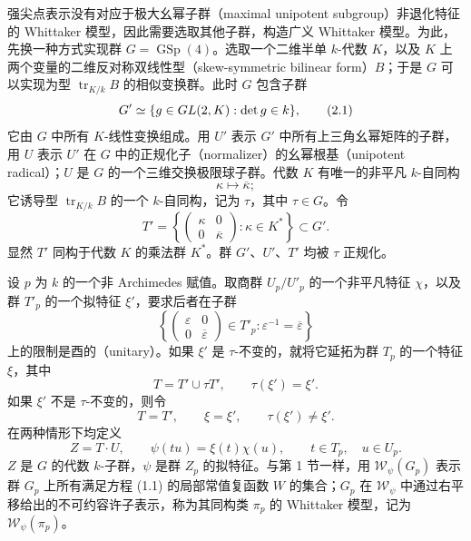 强尖点表示没有对应于极大幺幂子群（maximal unipotent subgroup）非退化特征的 Whittaker 模型，因此需要选取其他子群，构造广义 Whittaker 模型。为此，先换一种方式实现群 $G=\operatorname{GSp}(4)$。选取一个二维半单 $k$-代数 $K$，以及 $K$ 上两个变量的二维反对称双线性型（skew-symmetric bilinear form）$B$；于是 $G$ 可以实现为型 $\operatorname{tr}_{K/k}B$ 的相似变换群。此时 $G$ 包含子群
\begin{equation}
 G'\simeq\{g\in GL(2,K):\det g\in k\},
 \tag{2.1}
\end{equation}
它由 $G$ 中所有 $K$-线性变换组成。用 $U'$ 表示 $G'$ 中所有上三角幺幂矩阵的子群，用 $U$ 表示 $U'$ 在 $G$ 中的正规化子（normalizer）的幺幂根基（unipotent radical）；$U$ 是 $G$ 的一个三维交换极限球子群。代数 $K$ 有唯一的非平凡 $k$-自同构
\begin{equation}
 \kappa\longmapsto\overline\kappa;
 \tag{2.2}
\end{equation}
它诱导型 $\operatorname{tr}_{K/k}B$ 的一个 $k$-自同构，记为 $\tau$，其中 $\tau\in G$。令
\[
 T'=\left\{\begin{pmatrix}\kappa&0\\0&\overline\kappa\end{pmatrix}:\kappa\in K^*\right\}\subset G'.
\]
显然 $T'$ 同构于代数 $K$ 的乘法群 $K^*$。群 $G'$、$U'$、$T'$ 均被 $\tau$ 正规化。

设 $p$ 为 $k$ 的一个非 Archimedes 赋值。取商群 $U_p/U'_p$ 的一个非平凡特征 $\chi$，以及群 $T'_p$ 的一个拟特征 $\xi'$，要求后者在子群
\[
 \left\{\begin{pmatrix}\varepsilon&0\\0&\overline\varepsilon\end{pmatrix}\in T'_p:
 \varepsilon^{-1}=\overline\varepsilon\right\}
\]
上的限制是酉的（unitary）。如果 $\xi'$ 是 $\tau$-不变的，就将它延拓为群 $T_p$ 的一个特征 $\xi$，其中
\begin{equation}
 T=T'\cup\tau T',\qquad \tau(\xi')=\xi'.
 \tag{2.3}
\end{equation}
如果 $\xi'$ 不是 $\tau$-不变的，则令
\begin{equation}
 T=T',\qquad\xi=\xi',\qquad \tau(\xi')\ne\xi'.
 \tag{2.4}
\end{equation}
在两种情形下均定义
\begin{equation}
 Z=T\cdot U,\qquad\psi(tu)=\xi(t)\chi(u),
 \qquad t\in T_p,\quad u\in U_p.
 \tag{2.5}
\end{equation}
$Z$ 是 $G$ 的代数 $k$-子群，$\psi$ 是群 $Z_p$ 的拟特征。与第 1 节一样，用 $\mathcal W_\psi(G_p)$ 表示群 $G_p$ 上所有满足方程 (1.1) 的局部常值复函数 $W$ 的集合；$G_p$ 在 $\mathcal W_\psi$ 中通过右平移给出的不可约容许子表示，称为其同构类 $\pi_p$ 的 Whittaker 模型，记为 $\mathcal W_\psi(\pi_p)$。

